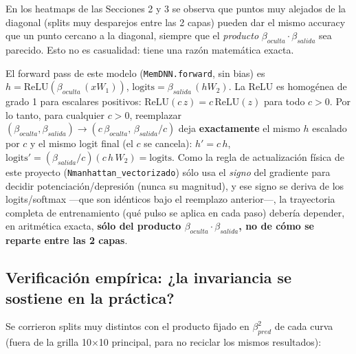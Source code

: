 \documentclass[11pt]{article}
\begin{document}
En los heatmaps de las Secciones 2 y 3 se observa que puntos muy alejados de la diagonal (splits muy desparejos entre las 2 capas) pueden dar el mismo accuracy que un punto cercano a la diagonal, siempre que el \emph{producto} $\beta_{oculta}\cdot\beta_{salida}$ sea parecido. Esto no es casualidad: tiene una razón matemática exacta.

El forward pass de este modelo (\texttt{MemDNN.forward}, sin bias) es $h=\mathrm{ReLU}(\beta_{oculta}\,(x W_1))$, $\mathrm{logits}=\beta_{salida}\,(h W_2)$. La ReLU es homogénea de grado 1 para escalares positivos: $\mathrm{ReLU}(c\,z)=c\,\mathrm{ReLU}(z)$ para todo $c>0$. Por lo tanto, para cualquier $c>0$, reemplazar $(\beta_{oculta},\beta_{salida}) \to (c\,\beta_{oculta},\, \beta_{salida}/c)$ deja \textbf{exactamente} el mismo $h$ escalado por $c$ y el mismo logit final (el $c$ se cancela): $h'=c\,h$, $\mathrm{logits}'=(\beta_{salida}/c)(c\,h\,W_2)=\mathrm{logits}$. Como la regla de actualización física de este proyecto (\texttt{Nmanhattan\_vectorizado}) sólo usa el \emph{signo} del gradiente para decidir potenciación/depresión (nunca su magnitud), y ese signo se deriva de los logits/softmax —que son idénticos bajo el reemplazo anterior—, la trayectoria completa de entrenamiento (qué pulso se aplica en cada paso) debería depender, en aritmética exacta, \textbf{sólo del producto $\beta_{oculta}\cdot\beta_{salida}$, no de cómo se reparte entre las 2 capas}.

\subsection{Verificación empírica: ¿la invariancia se sostiene en la práctica?}

Se corrieron splits muy distintos con el producto fijado en $\beta_{pred}^2$ de cada curva (fuera de la grilla 10$\times$10 principal, para no reciclar los mismos resultados):
\end{document}
